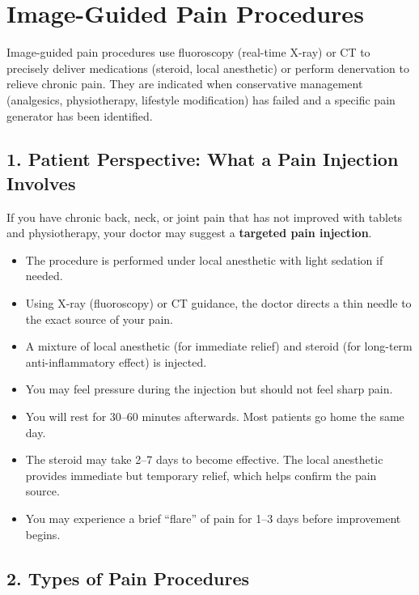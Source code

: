 \chapter{Image-Guided Pain Procedures}

\label{ch:ch82_pain_procedures}

Image-guided pain procedures use fluoroscopy (real-time X-ray) or CT to precisely deliver medications (steroid, local anesthetic) or perform denervation to relieve chronic pain. They are indicated when conservative management (analgesics, physiotherapy, lifestyle modification) has failed and a specific pain generator has been identified.


\section{1. Patient Perspective: What a Pain Injection Involves}

If you have chronic back, neck, or joint pain that has not improved with tablets and physiotherapy, your doctor may suggest a \textbf{targeted pain injection}.

\begin{itemize}
  \item The procedure is performed under local anesthetic with light sedation if needed.
  \item Using X-ray (fluoroscopy) or CT guidance, the doctor directs a thin needle to the exact source of your pain.
  \item A mixture of local anesthetic (for immediate relief) and steroid (for long-term anti-inflammatory effect) is injected.
  \item You may feel pressure during the injection but should not feel sharp pain.
  \item You will rest for 30--60 minutes afterwards. Most patients go home the same day.
  \item The steroid may take 2--7 days to become effective. The local anesthetic provides immediate but temporary relief, which helps confirm the pain source.
  \item You may experience a brief ``flare'' of pain for 1--3 days before improvement begins.
\end{itemize}


\section{2. Types of Pain Procedures}

